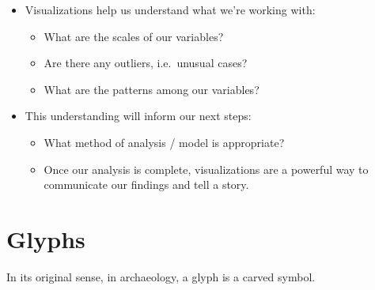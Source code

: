 \documentclass[
  letterpaper,
  DIV=11,
  numbers=noendperiod]{scrreprt}
\providecommand{\tightlist}{%
  \setlength{\itemsep}{0pt}\setlength{\parskip}{0pt}}\usepackage{longtable,booktabs,array}
\begin{document}
\begin{itemize}
\item
  Visualizations help us understand what we're working with:

  \begin{itemize}
  \tightlist
  \item
    What are the scales of our variables?\\
  \item
    Are there any outliers, i.e.~unusual cases?\\
  \item
    What are the patterns among our variables?\\
  \end{itemize}
\item
  This understanding will inform our next steps:

  \begin{itemize}
  \tightlist
  \item
    What method of analysis / model is appropriate?\\
  \item
    Once our analysis is complete, visualizations are a powerful way to
    communicate our findings and tell a story.
  \end{itemize}
\end{itemize}

\section*{Glyphs}\label{glyphs}


In its original sense, in archaeology, a glyph is a carved symbol.
\end{document}
